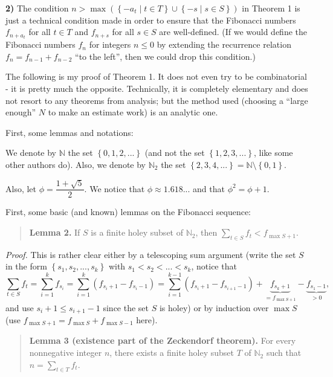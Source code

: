 \documentclass[12pt,final,notitlepage,onecolumn]{article}%
\begin{document}
\textbf{2)} The condition $n>\max\left(  \left\{  -a_{t}\mid t\in T\right\}
\cup\left\{  -s\mid s\in S\right\}  \right)  $ in Theorem 1 is just a
technical condition made in order to ensure that the Fibonacci numbers
$f_{n+a_{t}}$ for all $t\in T$ and $f_{n+s}$ for all $s\in S$ are
well-defined. (If we would define the Fibonacci numbers $f_{n}$ for integers
$n\leq0$ by extending the recurrence relation $f_{n}=f_{n-1}+f_{n-2}$ ``to the
left'', then we could drop this condition.)

The following is my proof of Theorem 1. It does not even try to be
combinatorial - it is pretty much the opposite. Technically, it is completely
elementary and does not resort to any theorems from analysis; but the method
used (choosing a ``large enough'' $N$ to make an estimate work) is an analytic one.

First, some lemmas and notations:

We denote by $\mathbb{N}$ the set $\left\{  0,1,2,...\right\}  $ (and not the
set $\left\{  1,2,3,...\right\}  $, like some other authors do). Also, we
denote by $\mathbb{N}_{2}$ the set $\left\{  2,3,4,...\right\}  =\mathbb{N}%
\setminus\left\{  0,1\right\}  $.

Also, let $\phi=\dfrac{1+\sqrt{5}}{2}$. We notice that $\phi\approx1.618...$
and that $\phi^{2}=\phi+1$.

First, some basic (and known) lemmas on the Fibonacci sequence:

\begin{quote}
\textbf{Lemma 2.} If $S$ is a finite holey subset of $\mathbb{N}_{2}$, then
$\sum\limits_{t\in S}f_{t}<f_{\max S+1}$.
\end{quote}

\textit{Proof.} This is rather clear either by a telescoping sum argument
(write the set $S$ in the form $\left\{  s_{1},s_{2},...,s_{k}\right\}  $ with
$s_{1}<s_{2}<...<s_{k}$, notice that
\[
\sum\limits_{t\in S}f_{t}=\sum\limits_{i=1}^{k}f_{s_{i}}=\sum\limits_{i=1}%
^{k}\left(  f_{s_{i}+1}-f_{s_{i}-1}\right)  =\sum\limits_{i=1}^{k-1}\left(
f_{s_{i}+1}-f_{s_{i+1}-1}\right)  +\underbrace{f_{s_{k}+1}}_{=f_{\max S+1}%
}-\underbrace{f_{s_{1}-1}}_{>0},
\]
and use $s_{i}+1\leq s_{i+1}-1$ since the set $S$ is holey) or by induction
over $\max S$ (use $f_{\max S+1}=f_{\max S}+f_{\max S-1}$ here).

\begin{quote}
\textbf{Lemma 3 (existence part of the Zeckendorf theorem).} For every
nonnegative integer $n$, there exists a finite holey subset $T$ of
$\mathbb{N}_{2}$ such that $n=\sum\limits_{t\in T}f_{t}$.
\end{quote}
\end{document}
